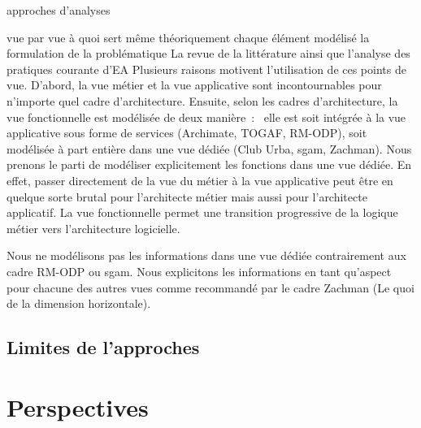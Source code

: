 approches d'analyses

vue par vue à quoi sert même théoriquement
chaque élément modélisé la formulation de la problématique
La revue de la littérature ainsi que
l'analyse des pratiques courante d'EA Plusieurs raisons
motivent l'utilisation de ces points de vue. D'abord, la vue métier et la vue
applicative sont incontournables pour n'importe quel cadre d'architecture.
Ensuite, selon les cadres d'architecture, la vue fonctionnelle est modélisée de
deux manière~:~ elle est soit intégrée à la vue applicative sous forme de
services (Archimate, TOGAF, RM-ODP), soit modélisée à part entière dans une vue
dédiée (Club Urba, \gls{sgam}, Zachman). Nous prenons le parti de modéliser
explicitement les fonctions dans une vue dédiée. En effet, passer directement
de la vue du métier à la vue applicative peut être en quelque sorte brutal pour
l'architecte métier mais aussi pour l'architecte applicatif. La vue fonctionnelle
permet une transition progressive de la logique métier vers l'architecture
logicielle.

Nous ne modélisons pas les informations dans une vue dédiée contrairement aux
cadre RM-ODP ou \gls{sgam}. Nous explicitons les informations en tant qu'aspect
pour chacune des autres vues comme recommandé par le cadre Zachman (Le quoi de
la dimension horizontale).

    \subsection{Limites de l'approches}

\section{Perspectives}
